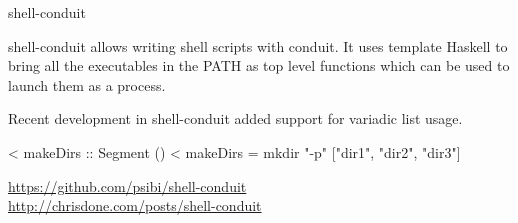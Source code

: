 \documentclass[DIV16,twocolumn,10pt]{scrreprt}
\begin{document}
\begin{hcarentry}{shell-conduit}
\makeheader

shell-conduit allows writing shell scripts with conduit. It uses
template Haskell to bring all the executables in the PATH as top level
functions which can be used to launch them as a process.

Recent development in shell-conduit added support for variadic list
usage.

< makeDirs :: Segment ()
< makeDirs = mkdir "-p" ["dir1", "dir2", "dir3"]

\FurtherReading
  \url{https://github.com/psibi/shell-conduit} \\
  \url{http://chrisdone.com/posts/shell-conduit}
\end{hcarentry}
\end{document}
